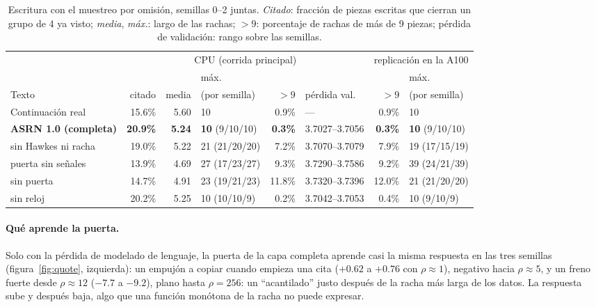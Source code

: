 \begin{table}[t]
\centering\small
\setlength{\tabcolsep}{3.3pt}
\begin{tabular}{lrrlrlrl}
\toprule
& \multicolumn{5}{c}{CPU (corrida principal)} & \multicolumn{2}{c}{replicación en la A100}\\
\cmidrule(lr){2-6}\cmidrule(lr){7-8}
& & & máx. & & & & máx.\\
Texto & citado & media & (por semilla) & $>9$ & pérdida val. & $>9$ & (por semilla)\\
\midrule
Continuación real & 15.6\% & 5.60 & 10 & 0.9\% & --- & 0.9\% & 10\\
\textbf{ASRN 1.0 (completa)} & \textbf{20.9\%} & \textbf{5.24} & \textbf{10} (9/10/10) & \textbf{0.3\%} &
3.7027--3.7056 & \textbf{0.3\%} & \textbf{10} (9/10/10)\\
sin Hawkes ni racha & 19.0\% & 5.22 & 21 (21/20/20) & 7.2\% & 3.7070--3.7079 & 7.9\% & 19 (17/15/19)\\
puerta sin señales & 13.9\% & 4.69 & 27 (17/23/27) & 9.3\% & 3.7290--3.7586 & 9.2\% & 39 (24/21/39)\\
sin puerta & 14.7\% & 4.91 & 23 (19/21/23) & 11.8\% & 3.7320--3.7396 & 12.0\% & 21 (21/20/20)\\
sin reloj & 20.2\% & 5.25 & 10 (10/10/9) & 0.2\% & 3.7042--3.7053 & 0.4\% & 10 (9/10/9)\\
\bottomrule
\end{tabular}
\caption{Escritura con el muestreo por omisión, semillas 0--2 juntas. \emph{Citado}: fracción de piezas escritas que
cierran un grupo de 4 ya visto; \emph{media}, \emph{máx.}: largo de las rachas; $>9$: porcentaje de rachas de más de 9
piezas; pérdida de validación: rango sobre las semillas.}
\label{tab:quote}
\end{table}

\paragraph{Qué aprende la puerta.} Solo con la pérdida de modelado de lenguaje, la puerta de la capa completa aprende
casi la misma respuesta en las tres semillas (figura~\ref{fig:quote}, izquierda): un empujón a copiar cuando empieza una
cita ($+0.62$ a $+0.76$ con $\rho\approx1$), negativo hacia $\rho\approx5$, y un freno fuerte desde $\rho\approx12$
($-7.7$ a $-9.2$), plano hasta $\rho=256$: un ``acantilado'' justo después de la racha más larga de los datos. La
respuesta sube y después baja, algo que una función monótona de la racha no puede expresar.

